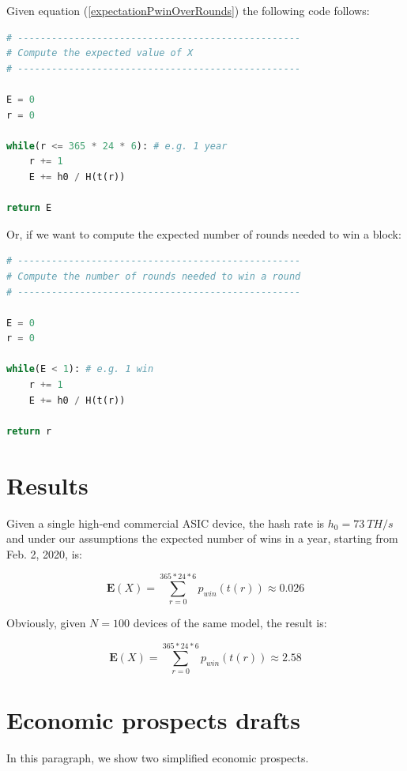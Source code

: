 \documentclass{book}
\theoremstyle{definition}
\begin{document}
Given equation (\ref{expectationPwinOverRounds}) the following code follows:

\begin{lstlisting}[language=Python]
# --------------------------------------------------
# Compute the expected value of X
# --------------------------------------------------

E = 0
r = 0

while(r <= 365 * 24 * 6): # e.g. 1 year
    r += 1
    E += h0 / H(t(r))

return E
\end{lstlisting}

Or, if we want to compute the expected number of rounds needed to win a block:

\begin{lstlisting}[language=Python]
# --------------------------------------------------
# Compute the number of rounds needed to win a round
# --------------------------------------------------

E = 0
r = 0

while(E < 1): # e.g. 1 win
    r += 1
    E += h0 / H(t(r))

return r
\end{lstlisting}

\section{Results}

Given a single high-end commercial ASIC device, the hash rate is $h_{0} = 73\ TH/s$ and under our assumptions
the expected number of wins in a year, starting from Feb. 2, 2020, is:

\begin{equation}
    \mathbf{E}(X) = \displaystyle\sum_{r=0}^{365*24*6} p_{win}(t(r)) \approx 0.026 \label{res1}
\end{equation}

Obviously, given $N=100$ devices of the same model, the result is:

\begin{equation}
    \mathbf{E}(X) = \displaystyle\sum_{r=0}^{365*24*6} p_{win}(t(r)) \approx 2.58 \label{res11}
\end{equation}

\section{Economic prospects drafts}

In this paragraph, we show two simplified economic prospects.
\end{document}
